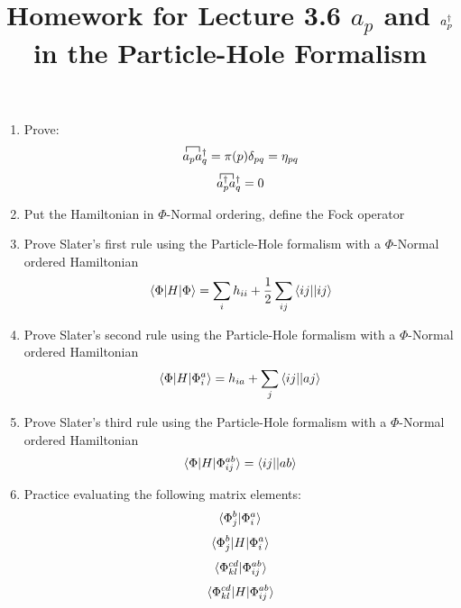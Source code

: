 \documentclass{article}
\title{Homework for Lecture 3.6 $a_p$ and $a_p\dg$ in the Particle-Hole Formalism}
\date{}
\newcommand{\fctr}{\contraction}
\newcommand{\dg}{\ensuremath{^\dagger} }
\begin{document}
\maketitle
\noindent
\begin{enumerate}
\item Prove:
 $$
 \fctr{}{a}{{}_p}{a}
 a_p a_q\dg = \pi(p)\delta_{pq} = \eta_{pq}
 $$
 $$
 \fctr{}{a}{{}_p}{a}
 a_p\dg a_q\dg = 0
 $$
\item Put the Hamiltonian in $\Phi$-Normal ordering, define the Fock operator
\item Prove Slater's first rule using the Particle-Hole formalism with a $\Phi$-Normal ordered Hamiltonian 
\[\braket{\Phi|H|\Phi} = \sum_i h_{ii} + \frac{1}{2} \sum_{ij} \braket{ij || ij} \]
\item Prove Slater's second rule using the Particle-Hole formalism with a $\Phi$-Normal ordered Hamiltonian 
\[\braket{\Phi|H|\Phi_i^a} = h_{ia} + \sum_{j} \braket{ij || aj} \]
\item Prove Slater's third rule using the Particle-Hole formalism with a $\Phi$-Normal ordered Hamiltonian 
\[\braket{\Phi|H|\Phi_{ij}^{ab}} = \braket{ij || ab} \]
\item Practice evaluating the following matrix elements: 
\[ \braket{\Phi_j^b |\Phi_{i}^{a}} \]
\[ \braket{\Phi_j^b |H| \Phi_{i}^{a}} \]
\[ \braket{\Phi_{kl}^{cd}|\Phi_{ij}^{ab}} \]
\[ \braket{\Phi_{kl}^{cd}|H|\Phi_{ij}^{ab}} \]
\end{enumerate}
\end{document}
